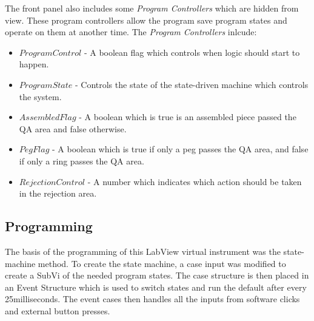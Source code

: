 \documentclass[12pt]{article}
\begin{document}
  The front panel also includes some \textit{Program Controllers} which are hidden from view.
  These program controllers allow the program save program states and operate on them at another time.
  The \textit{Program Controllers} inlcude:
  \begin{itemize}
    \item $ProgramControl$ - A boolean flag which controls when logic should start to happen.
    \item $ProgramState$ - Controls the state of the state-driven machine which controls the system.
    \item $AssembledFlag$ - A boolean which is true is an assembled piece passed the QA area and false otherwise.
    \item $PegFlag$ - A boolean which is true if only a peg passes the QA area, and false if only a ring
    passes the QA area.
    \item $RejectionControl$ - A number which indicates which action should be taken in the rejection area.
  \end{itemize}

\subsection{Programming}
  The basis of the programming of this LabView virtual instrument was the state-machine method.
  To create the state machine, a case input was modified to create a SubVi of the needed program states.
  The case structure is then placed in an Event Structure which is used to switch states and run the default
  after every 25milliseconds. The event cases then handles all the inputs from software clicks and external
  button presses.
\end{document}
